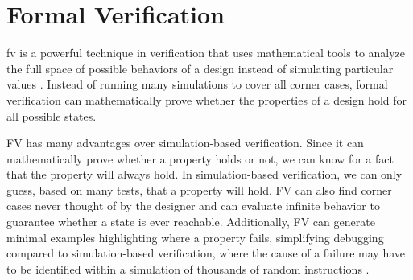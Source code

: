 %
%
%
%
%
%
%
%
%
%
%
%
%

\section{Formal Verification}
\label{sec:bg_formal}

\acrfull{fv} is a powerful technique in verification that uses mathematical tools to analyze the full space of possible behaviors of a design instead of simulating particular values \cite{seligmanFormalVerificationEssential2015}. Instead of running many simulations to cover all corner cases, formal verification can mathematically prove whether the properties of a design hold for all possible states.

FV has many advantages over simulation-based verification. Since it can mathematically prove whether a property holds or not, we can know for a fact that the property will always hold. In simulation-based verification, we can only guess, based on many tests, that a property will hold. FV can also find corner cases never thought of by the designer and can evaluate infinite behavior to guarantee whether a state is ever reachable.
Additionally, FV can generate minimal examples highlighting where a property fails, simplifying debugging compared to simulation-based verification, where the cause of a failure may have to be identified within a simulation of thousands of random instructions \cite{seligmanFormalVerificationEssential2015}.

